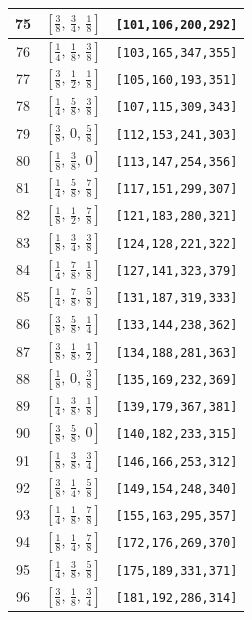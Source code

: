 \documentclass[fleqn,8pt]{jsarticle}
\begin{document}
\begin{longtable}{ccc}
75 & $\left[ \frac{3}{8},\, \frac{3}{4},\, \frac{1}{8} \right]$ & {\tt [101,106,200,292]} \\ \hline
76 & $\left[ \frac{1}{4},\, \frac{1}{8},\, \frac{3}{8} \right]$ & {\tt [103,165,347,355]} \\ \hline
77 & $\left[ \frac{3}{8},\, \frac{1}{2},\, \frac{1}{8} \right]$ & {\tt [105,160,193,351]} \\ \hline
78 & $\left[ \frac{1}{4},\, \frac{5}{8},\, \frac{3}{8} \right]$ & {\tt [107,115,309,343]} \\ \hline
79 & $\left[ \frac{3}{8},\, 0,\, \frac{5}{8} \right]$ & {\tt [112,153,241,303]} \\ \hline
80 & $\left[ \frac{1}{8},\, \frac{3}{8},\, 0 \right]$ & {\tt [113,147,254,356]} \\ \hline
81 & $\left[ \frac{1}{4},\, \frac{5}{8},\, \frac{7}{8} \right]$ & {\tt [117,151,299,307]} \\ \hline
82 & $\left[ \frac{1}{8},\, \frac{1}{2},\, \frac{7}{8} \right]$ & {\tt [121,183,280,321]} \\ \hline
83 & $\left[ \frac{1}{8},\, \frac{3}{4},\, \frac{3}{8} \right]$ & {\tt [124,128,221,322]} \\ \hline
84 & $\left[ \frac{1}{4},\, \frac{7}{8},\, \frac{1}{8} \right]$ & {\tt [127,141,323,379]} \\ \hline
85 & $\left[ \frac{1}{4},\, \frac{7}{8},\, \frac{5}{8} \right]$ & {\tt [131,187,319,333]} \\ \hline
86 & $\left[ \frac{3}{8},\, \frac{5}{8},\, \frac{1}{4} \right]$ & {\tt [133,144,238,362]} \\ \hline
87 & $\left[ \frac{3}{8},\, \frac{1}{8},\, \frac{1}{2} \right]$ & {\tt [134,188,281,363]} \\ \hline
88 & $\left[ \frac{1}{8},\, 0,\, \frac{3}{8} \right]$ & {\tt [135,169,232,369]} \\ \hline
89 & $\left[ \frac{1}{4},\, \frac{3}{8},\, \frac{1}{8} \right]$ & {\tt [139,179,367,381]} \\ \hline
90 & $\left[ \frac{3}{8},\, \frac{5}{8},\, 0 \right]$ & {\tt [140,182,233,315]} \\ \hline
91 & $\left[ \frac{1}{8},\, \frac{3}{8},\, \frac{3}{4} \right]$ & {\tt [146,166,253,312]} \\ \hline
92 & $\left[ \frac{3}{8},\, \frac{1}{4},\, \frac{5}{8} \right]$ & {\tt [149,154,248,340]} \\ \hline
93 & $\left[ \frac{1}{4},\, \frac{1}{8},\, \frac{7}{8} \right]$ & {\tt [155,163,295,357]} \\ \hline
94 & $\left[ \frac{1}{8},\, \frac{1}{4},\, \frac{7}{8} \right]$ & {\tt [172,176,269,370]} \\ \hline
95 & $\left[ \frac{1}{4},\, \frac{3}{8},\, \frac{5}{8} \right]$ & {\tt [175,189,331,371]} \\ \hline
96 & $\left[ \frac{3}{8},\, \frac{1}{8},\, \frac{3}{4} \right]$ & {\tt [181,192,286,314]} \\
\end{longtable}
\end{document}
